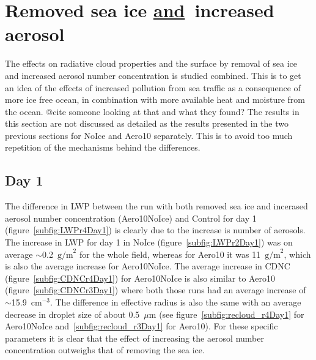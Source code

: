 
\clearpage
\section{Removed sea ice \underline{and}~increased aerosol}
The effects on radiative cloud properties and the surface by removal of sea ice and increased aerosol number concentration is studied combined. This is to get an idea of the effects of increased pollution from sea traffic as a consequence of more ice free ocean, in combination with more available heat and moisture from the ocean. @cite someone looking at that and what they found? The results in this section are not discussed as detailed as the results presented in the two previous sections for NoIce and Aero10 separately. This is to avoid too much repetition of the mechanisms behind the differences.

\subsection{Day 1}
The difference in LWP between the run with both removed sea ice and incerased aerosol number concentration (Aero10NoIce) and Control for day 1 (figure~\ref{subfig:LWPr4Day1}) is clearly due to the increase is number of aerosols. The increase in LWP for day 1 in NoIce (figure~\ref{subfig:LWPr2Day1}) was on average $\sim$0.2~$\text{g/m}^2$ for the whole field, whereas for Aero10 it was 11~$\text{g/m}^2$, which is also the average increase for Aero10NoIce. The average increase in CDNC (figure~\ref{subfig:CDNCr4Day1}) for Aero10NoIce is also similar to Aero10 (figure~\ref{subfig:CDNCr3Day1}) where both those runs had an average increase of $\sim$15.9~$\text{cm}^{-3}$. The difference in effective radius is also the same with an average decrease in droplet size of about 0.5~$\mu\text{m}$ (see figure~\ref{subfig:recloud_r4Day1} for Aero10NoIce and~\ref{subfig:recloud_r3Day1} for Aero10). For these specific parameters it is clear that the effect of increasing the aerosol number concentration outweighs that of removing the sea ice.

